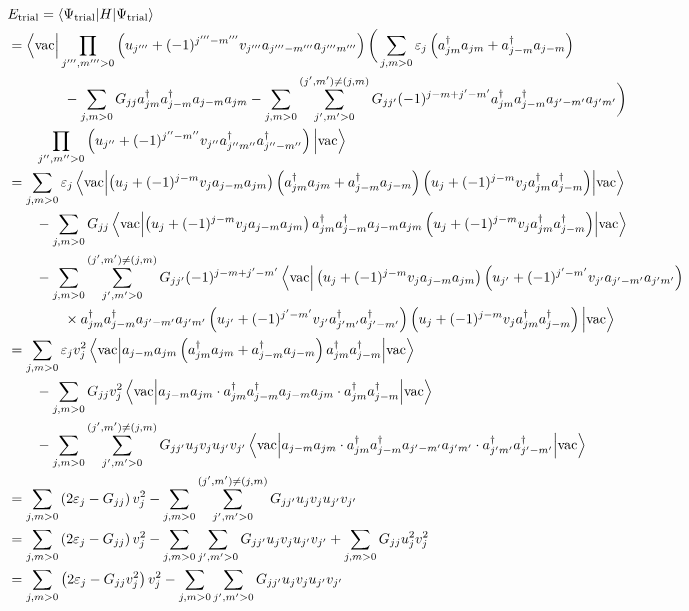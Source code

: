 \documentclass[8pt, a4paper]{article}
\newcommand{\ket}[1]{\left\vert#1\right\rangle}
\newcommand{\bra}[1]{\left\langle#1\right\vert}
\newcommand{\bracket}[3]{\left\langle#1\middle\vert#2\middle\vert#3\right\rangle}
\begin{document}
\begin{align*}
&E_\mathrm{trial} = \bracket{\Psi_\mathrm{trial}}H{\Psi_\mathrm{trial}}
\\&=
\bra{\mathrm{vac}\vphantom{a_j^\dagger}}\prod_{j''',m'''>0}\left(u_{j'''} + (-1)^{j'''-m'''}v_{j'''}a_{j'''-m'''}a_{j'''m'''}\right)
\bigg(
\sum_{j,m>0}\varepsilon_j\left(a_{jm}^\dagger a_{jm} + a_{j-m}^\dagger a_{j-m}\right) 
\\&\qquad\qquad
-\sum_{j,m>0}G_{jj}a_{jm}^\dagger a_{j-m}^\dagger a_{j-m}a_{jm}- \sum_{j,m>0}\sum_{j',m'>0}^{(j',m')\neq (j,m)}G_{jj'}(-1)^{j-m+j'-m'}a_{jm}^\dagger a_{j-m}^\dagger a_{j'-m'}a_{j'm'}
\bigg)
\\&\qquad
\prod_{j'',m''>0}\left(u_{j''} +(-1)^{j''-m''}v_{j''}a_{j''m''}^\dagger a_{j''-m''}^\dagger\right)\ket{\mathrm{vac}\vphantom{a_j^\dagger}}
\\&=
\sum_{j,m>0}\varepsilon_j\bracket{\mathrm{vac}}{\left(u_j + (-1)^{j-m}v_ja_{j-m}a_{jm}\right)\left(a_{jm}^\dagger a_{jm} + a_{j-m}^\dagger a_{j-m}\right)\left(u_j + (-1)^{j-m}v_j a_{jm}^\dagger a_{j-m}^\dagger\right)}{\mathrm{vac}}
\\&\qquad-
\sum_{j,m>0}G_{jj}\bracket{\mathrm{vac}}{\left(u_j + (-1)^{j-m}v_ja_{j-m}a_{jm}\right)a_{jm}^\dagger a_{j-m}^\dagger a_{j-m} a_{jm}\left(u_j + (-1)^{j-m}v_j a_{jm}^\dagger a_{j-m}^\dagger\right)}{\mathrm{vac}}
\\&\qquad-
\sum_{j,m>0}\sum_{j',m'>0}^{(j',m')\neq(j,m)}G_{jj'}(-1)^{j-m+j'-m'}\bra{\mathrm{vac}\vphantom{a_j^\dagger}} \left(u_j + (-1)^{j-m}v_ja_{j-m}a_{jm}\right)\left(u_{j'} + (-1)^{j'-m'}v_{j'}a_{j'-m'}a_{j'm'}\right)
\\&\qquad\qquad\times a_{jm}^\dagger a_{j-m}^\dagger a_{j'-m'}a_{j'm'}\left(u_{j'} + (-1)^{j'-m'}v_{j'} a_{j'm'}^\dagger a_{j'-m'}^\dagger\right)\left(u_j + (-1)^{j-m}v_ja_{jm}^\dagger a_{j-m}^\dagger\right)\ket{\mathrm{vac}\vphantom{a_j^\dagger}}
\\&=
\sum_{j,m>0}\varepsilon_jv_j^2\bracket{\mathrm{vac}}{a_{j-m}a_{jm}\left(a_{jm}^\dagger a_{jm} + a_{j-m}^\dagger a_{j-m}\right)a_{jm}^\dagger a_{j-m}^\dagger}{\mathrm{vac}}
\\&\qquad-
\sum_{j,m>0}G_{jj}v_j^2\bracket{\mathrm{vac}}{a_{j-m}a_{jm}\cdot a_{jm}^\dagger a_{j-m}^\dagger a_{j-m} a_{jm}\cdot a_{jm}^\dagger a_{j-m}^\dagger}{\mathrm{vac}}
\\&\qquad-
\sum_{j,m>0}\sum_{j',m'>0}^{(j',m')\neq(j,m)}G_{jj'}u_jv_ju_{j'} v_{j'}\bracket{\mathrm{vac}}{a_{j-m}a_{jm}\cdot a_{jm}^\dagger a_{j-m}^\dagger a_{j'-m'} a_{j'm'}\cdot a_{j'm'}^\dagger a_{j'-m'}^\dagger}{\mathrm{vac}}
\\&=
\sum_{j,m>0}\left(2\varepsilon_j - G_{jj}\right)v_j^2 - \sum_{j,m>0}\sum_{j',m'>0}^{(j',m')\neq(j,m)}G_{jj'}u_jv_ju_{j'}v_{j'}
\\&=
\sum_{j,m>0}\left(2\varepsilon_j - G_{jj}\right)v_j^2 - \sum_{j,m>0}\sum_{j',m'>0}G_{jj'}u_jv_ju_{j'}v_{j'} + \sum_{j,m>0}G_{jj}u_j^2v_j^2
\\&=
\sum_{j,m>0}\left(2\varepsilon_j - G_{jj}v_j^2\right)v_j^2 - \sum_{j,m>0}\sum_{j',m'>0}G_{jj'}u_jv_ju_{j'}v_{j'}
\end{align*}
\end{document}
